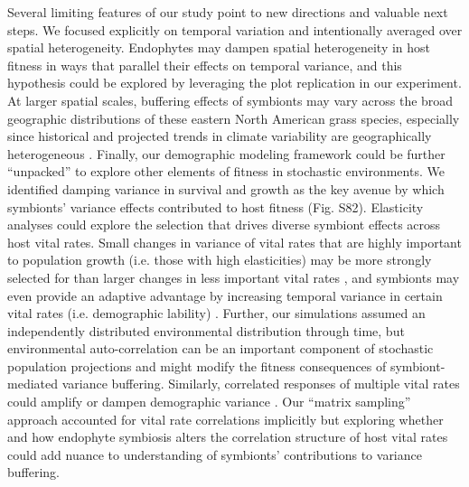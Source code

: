\documentclass[lineno, sn-basic]{sn-jnl}%
\begin{document}
Several limiting features of our study point to new directions and valuable next steps. 
We focused explicitly on temporal variation and intentionally averaged over spatial heterogeneity. 
Endophytes may dampen spatial heterogeneity in host fitness in ways that parallel their effects on temporal variance, and this hypothesis could be explored by leveraging the plot replication in our experiment. 
At larger spatial scales, buffering effects of symbionts may vary across the broad geographic distributions of these eastern North American grass species, especially since historical and projected trends in climate variability are geographically heterogeneous \citep{bathiany2018climate}.
Finally, our demographic modeling framework could be further ``unpacked'' to explore other elements of fitness in stochastic environments. 
We identified damping variance in survival and growth as the key avenue by which symbionts' variance effects contributed to host fitness (Fig. S82). 
Elasticity analyses could explore the selection that drives diverse symbiont effects across host vital rates. 
Small changes in variance of vital rates that are highly important to population growth (i.e. those with high elasticities) may be more strongly selected for than larger changes in less important vital rates \citep{doak2005correctly}, and symbionts may even provide an adaptive advantage by increasing temporal variance in certain vital rates (i.e. demographic lability) \citep{koons2009life}.
Further, our simulations assumed an independently distributed environmental distribution through time, but environmental auto-correlation can be an important component of stochastic population projections \citep{tuljapurkar2006temporal} and might modify the fitness consequences of symbiont-mediated variance buffering. 
Similarly, correlated responses of multiple vital rates could amplify or dampen demographic variance \citep{tuljapurkar2013population,davison2013contributions,compagnoni2016effect}. 
Our ``matrix sampling'' approach accounted for vital rate correlations implicitly \citep{metcalf2015statistical} but exploring whether and how endophyte symbiosis alters the correlation structure of host vital rates could add nuance to understanding of symbionts' contributions to variance buffering. 
\end{document}
